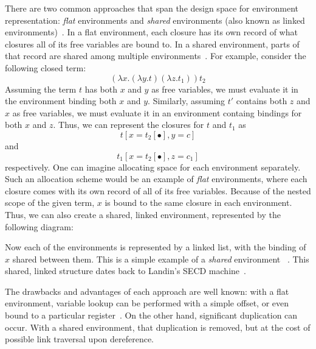 \documentclass[preprint]{sigplanconf}
\begin{document}
There are two common approaches that span the design space for environment
representation: \emph{flat} environments and \emph{shared} environments (also
known as linked environments)~\cite{appel1988optimizing, shao1994space}. In a flat
environment, each closure has its own record of what closures all
of its free variables are bound to. In a shared environment, parts
of that record are shared among multiple environments~\cite{appel1988optimizing,
shao1994space}. For example, consider the following closed term: $$(\lambda
x.(\lambda y.t) (\lambda z.t_1)) t_2$$ Assuming the term $t$ has both $x$ and
$y$ as free variables, we must evaluate it in the environment binding both $x$
and $y$.  Similarly, assuming $t'$ contains both $z$ and $x$ as free variables,
we must evaluate it in an environment containg bindings for both $x$ and $z$.
Thus, we can represent the closures for $t$ and $t_1$ as
$$t[x=t_2[\bullet], y=c]$$ and $$t_1[x=t_2[\bullet], z=c_1]$$ respectively. One
can imagine allocating space for each environment separately. Such an allocation
scheme would be an example of \emph{flat} environments, where each closure comes
with its own record of all of its free variables. Because of the nested scope of
the given term, $x$ is bound to the same closure in each environment.  Thus, we
can also create a shared, linked environment, represented by the following
diagram:

\begin{center}
\end{center}
Now each of the environments is represented by a linked list, with the binding
of $x$ shared between them. This is a simple example of a \emph{shared}
environment ~\cite{appel1988optimizing}. This shared, linked structure dates
back to Landin's SECD
machine~\cite{landin1964mechanical}.

The drawbacks and advantages of each approach are well known: with a flat
environment, variable lookup can be performed with a simple offset, or even
bound to a particular register~\cite{jonesstg, appel2006compiling}. On the other
hand, significant duplication can occur. With a shared environment, that
duplication is removed, but at the cost of possible link traversal upon
dereference. 
\end{document}
